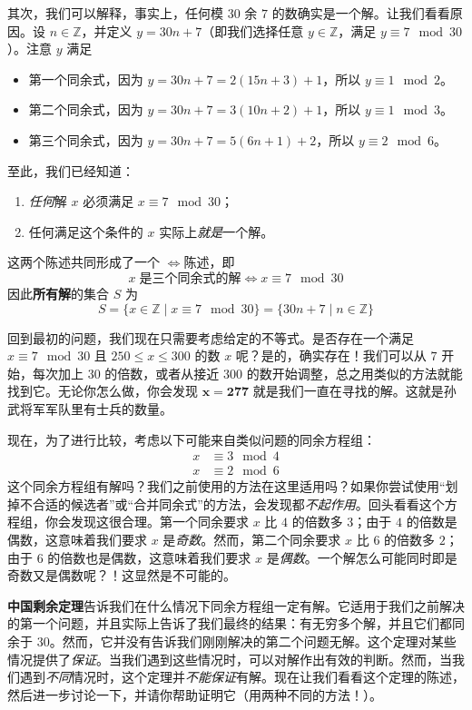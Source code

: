 其次，我们可以解释，事实上，任何模 $30$ 余 $7$ 的数确实是一个解。让我们看看原因。设 $n \in \mathbb{Z}$，并定义 $y = 30n + 7$（即我们选择任意 $y \in \mathbb{Z}$，满足 $y \equiv 7 \mod 30$）。注意 $y$ 满足
\begin{itemize}
    \item 第一个同余式，因为 $y = 30n + 7 = 2(15n + 3) + 1$，所以 $y \equiv 1 \mod 2$。
    \item 第二个同余式，因为 $y = 30n + 7 = 3(10n + 2) + 1$，所以 $y \equiv 1 \mod 3$。
    \item 第三个同余式，因为 $y = 30n + 7 = 5( 6n + 1) + 2$，所以 $y \equiv 2 \mod 6$。
\end{itemize}
至此，我们已经知道：
\begin{enumerate}[label=(\arabic*)]
    \item \emph{任何}解 $x$ 必须满足 $x \equiv 7 \mod 30$；
    \item 任何满足这个条件的 $x$ 实际上\emph{就是}一个解。
\end{enumerate}
这两个陈述共同形成了一个 $\iff$陈述，即
\[x \;\text{是三个同余式的解} \iff x \equiv 7 \mod 30\]
因此\textbf{所有解}的集合 $S$ 为
\[S = \{x \in \mathbb{Z} \mid x \equiv 7 \mod 30\} = \{30n + 7 \mid n \in \mathbb{Z}\}\]

回到最初的问题，我们现在只需要考虑给定的不等式。是否存在一个满足 $x \equiv 7 \mod 30$ 且 $250 \le x \le 300$ 的数 $x$ 呢？是的，确实存在！我们可以从 $7$ 开始，每次加上 $30$ 的倍数，或者从接近 $300$ 的数开始调整，总之用类似的方法就能找到它。无论你怎么做，你会发现 $\mathbf{x = 277}$ 就是我们一直在寻找的解。这就是孙武将军军队里有士兵的数量。

现在，为了进行比较，考虑以下可能来自类似问题的同余方程组：
\begin{align*}
    x &\equiv 3 \mod 4 \\
    x &\equiv 2 \mod 6
\end{align*}
这个同余方程组有解吗？我们之前使用的方法在这里适用吗？如果你尝试使用``划掉不合适的候选者''或``合并同余式''的方法，会发现都\emph{不起作用}。回头看看这个方程组，你会发现这很合理。第一个同余要求 $x$ 比 $4$ 的倍数多 $3$；由于 $4$ 的倍数是偶数，这意味着我们要求 $x$ 是\emph{奇数}。然而，第二个同余要求 $x$ 比 $6$ 的倍数多 $2$；由于 $6$ 的倍数也是偶数，这意味着我们要求 $x$ 是\emph{偶数}。一个解怎么可能同时即是奇数又是偶数呢？！这显然是不可能的。

\textbf{中国剩余定理}告诉我们在什么情况下同余方程组一定有解。它适用于我们之前解决的第一个问题，并且实际上告诉了我们最终的结果：有无穷多个解，并且它们都同余于 $30$。然而，它并没有告诉我们刚刚解决的第二个问题无解。这个定理对某些情况提供了\emph{保证}。当我们遇到这些情况时，可以对解作出有效的判断。然而，当我们遇到\emph{不同}情况时，这个定理并\emph{不能保证}有解。现在让我们看看这个定理的陈述，然后进一步讨论一下，并请你帮助证明它（用两种不同的方法！）。

